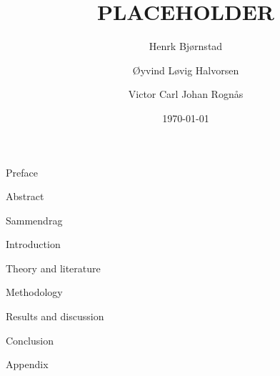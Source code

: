 \documentclass[12pt]{article}
\begin{document}

\author{Henrk Bjørnstad \and Øyvind Løvig Halvorsen \and Victor Carl Johan Rognås}
\title{PLACEHOLDER}
\date{\today}

{Preface}
\newpage

{Abstract}
\newpage

{Sammendrag}
\newpage

\begin{spacing}{0.82} %
    \listoffigures
    \newpage

    \listoftables
    \newpage
    
    \tableofcontents
    \newpage
\end{spacing}

\setcounter{page}{1}
{Introduction}

\newpage
{Theory and literature}

\newpage
{Methodology}

\newpage
{Results and discussion}

\newpage
{Conclusion}

\newpage
\newrefcontext[sorting=nyt]
\printbibliography[heading = bibintoc, title = References]

\newpage
{Appendix}
\end{document}

